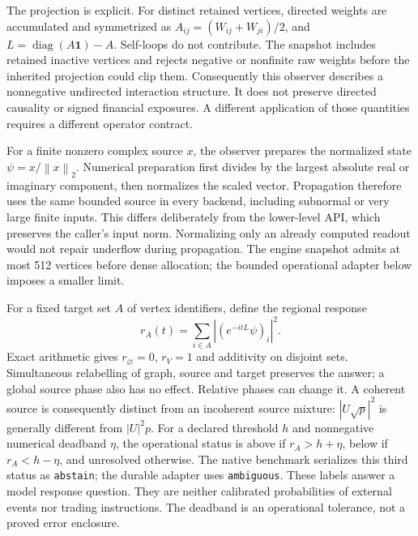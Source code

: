 \documentclass[11pt,a4paper]{article}
\theoremstyle{definition}\newtheorem{definition}[theorem]{Definition}
\newcommand{\norm}[1]{\left\lVert#1\right\rVert}
\begin{document}
The projection is explicit. For distinct retained vertices, directed weights
are accumulated and symmetrized as $A_{ij}=(W_{ij}+W_{ji})/2$, and
$L=\operatorname{diag}(A\boldsymbol{1})-A$. Self-loops do not contribute.
The snapshot includes retained inactive vertices and rejects negative or
nonfinite raw weights before the inherited projection could clip them.
Consequently this observer describes a nonnegative undirected interaction
structure. It does not preserve directed causality or signed financial
exposures. A different application of those quantities requires a different
operator contract.

For a finite nonzero complex source $x$, the observer prepares the normalized
state $\psi=x/\norm{x}_2$. Numerical preparation first divides by the largest
absolute real or imaginary component, then normalizes the scaled vector.
Propagation therefore uses the same bounded source in every backend, including
subnormal or very large finite inputs. This differs deliberately from the
lower-level API, which preserves the caller's input norm. Normalizing only an
already computed readout would not repair underflow during propagation. The
engine snapshot admits at most 512 vertices before dense allocation; the
bounded operational adapter below imposes a smaller limit.

For a fixed target set $A$ of vertex identifiers, define the regional response
\begin{equation}\label{eq:regionresponse}
 r_A(t)=\sum_{i\in A}|(e^{-itL}\psi)_i|^2.
\end{equation}
Exact arithmetic gives $r_{\varnothing}=0$, $r_{V}=1$ and additivity on disjoint
sets. Simultaneous relabelling of graph, source and target preserves the answer;
a global source phase also has no effect. Relative phases can change it.
A coherent source is consequently distinct from an incoherent source mixture:
$|U\sqrt p|^2$ is generally different from $|U|^2p$.
For a declared threshold $h$ and nonnegative numerical deadband $\eta$, the
operational status is above if $r_A>h+\eta$, below if $r_A<h-\eta$, and
unresolved otherwise. The native benchmark serializes this third status as \texttt{abstain}; the durable adapter uses \texttt{ambiguous}. These labels answer a model response question. They are
neither calibrated probabilities of external events nor trading instructions.
The deadband is an operational tolerance, not a proved error enclosure.
\end{document}
